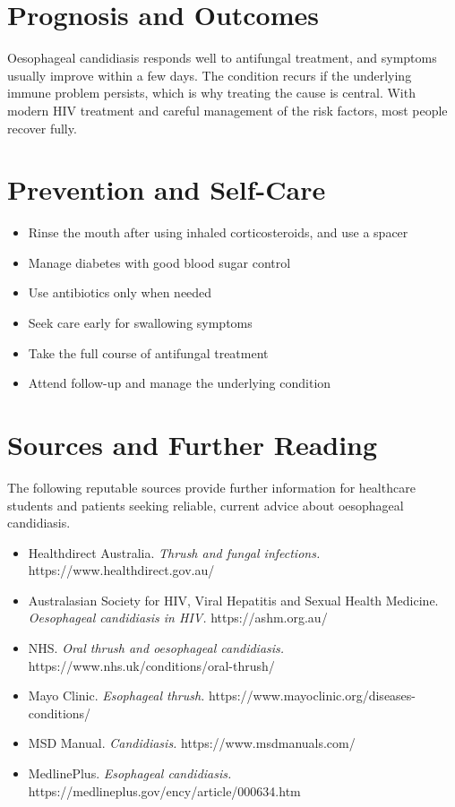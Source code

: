 \section*{Prognosis and Outcomes}
Oesophageal candidiasis responds well to antifungal treatment, and symptoms usually improve within a few days. The condition recurs if the underlying immune problem persists, which is why treating the cause is central. With modern HIV treatment and careful management of the risk factors, most people recover fully.

\section*{Prevention and Self-Care}
\begin{itemize}
    \item Rinse the mouth after using inhaled corticosteroids, and use a spacer
    \item Manage diabetes with good blood sugar control
    \item Use antibiotics only when needed
    \item Seek care early for swallowing symptoms
    \item Take the full course of antifungal treatment
    \item Attend follow-up and manage the underlying condition
\end{itemize}

\section*{Sources and Further Reading}
The following reputable sources provide further information for healthcare students and patients seeking reliable, current advice about oesophageal candidiasis.
\begin{itemize}
    \item Healthdirect Australia. \textit{Thrush and fungal infections.} https://www.healthdirect.gov.au/
    \item Australasian Society for HIV, Viral Hepatitis and Sexual Health Medicine. \textit{Oesophageal candidiasis in HIV.} https://ashm.org.au/
    \item NHS. \textit{Oral thrush and oesophageal candidiasis.} https://www.nhs.uk/conditions/oral-thrush/
    \item Mayo Clinic. \textit{Esophageal thrush.} https://www.mayoclinic.org/diseases-conditions/
    \item MSD Manual. \textit{Candidiasis.} https://www.msdmanuals.com/
    \item MedlinePlus. \textit{Esophageal candidiasis.} https://medlineplus.gov/ency/article/000634.htm
\end{itemize}

